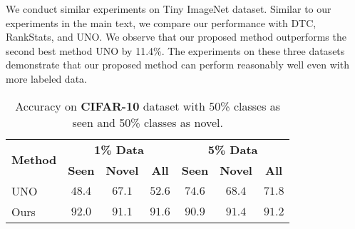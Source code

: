 \documentclass[runningheads]{eccv2022submission}
\begin{document}
We conduct similar experiments on Tiny ImageNet dataset. Similar to our experiments in the main text, we compare our performance with DTC\cite{han2019learning}, RankStats\cite{Han2020Automatically}, and UNO\cite{fini2021unified}. We observe that our proposed method outperforms the second best method UNO by 11.4\%. The experiments on these three datasets demonstrate that our proposed method can perform reasonably well even with more labeled data.   



\begin{table}[h]
\caption{Accuracy on \textbf{CIFAR-10} dataset with 50\% classes as seen and 50\% classes as novel.}
\label{tab:cifar10}
\begin{center}\setlength{\tabcolsep}{4pt}
\small
\begin{tabular}{lccc|ccc}
\hline



\multicolumn{1}{c}{\multirow{2}{*}{\textbf{Method}}} & \multicolumn{3}{c|}{\textbf{1\% Data}} & \multicolumn{3}{c}{\textbf{5\% Data}} \\  
\multicolumn{1}{c}{} & \textbf{Seen} & \textbf{Novel} & \textbf{All}  & \textbf{Seen} & \textbf{Novel} & \textbf{All}\\




\hline
UNO\cite{fini2021unified} & $48.4$ & $67.1$ & $52.6$ & $74.6$ & $68.4$ & $71.8$\\
Ours & {\cellcolor{yellow!15}}${92.0}$ & {\cellcolor{yellow!15}}${91.1}$ & {\cellcolor{yellow!15}}${91.6}$ & {\cellcolor{yellow!15}}${90.9}$ & {\cellcolor{yellow!15}}${91.4}$ & {\cellcolor{yellow!15}}${91.2}$\\\hline 



\end{tabular}
\end{center}
\vspace{-3mm}
\end{table}
\end{document}
